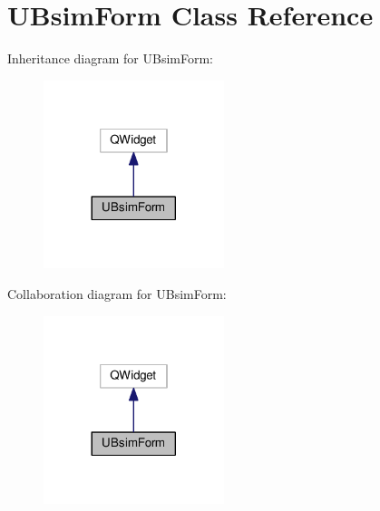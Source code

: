 \hypertarget{class_u_bsim_form}{}\section{U\+Bsim\+Form Class Reference}
\label{class_u_bsim_form}


Inheritance diagram for U\+Bsim\+Form\+:
\nopagebreak
\begin{figure}[H]
\begin{center}
\leavevmode
\includegraphics[width=149pt]{class_u_bsim_form__inherit__graph}
\end{center}
\end{figure}


Collaboration diagram for U\+Bsim\+Form\+:
\nopagebreak
\begin{figure}[H]
\begin{center}
\leavevmode
\includegraphics[width=149pt]{class_u_bsim_form__coll__graph}
\end{center}
\end{figure}
